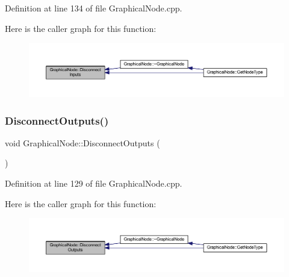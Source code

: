 Definition at line 134 of file Graphical\+Node.\+cpp.

Here is the caller graph for this function\+:
\nopagebreak
\begin{figure}[H]
\begin{center}
\leavevmode
\includegraphics[width=350pt]{class_graphical_node_adf7b68c28c70426681cef018d34f8988_icgraph}
\end{center}
\end{figure}
\mbox{\label{class_graphical_node_a80e76a5ae9dd27b0445a1e6943074852}} 
\subsubsection{\texorpdfstring{Disconnect\+Outputs()}{DisconnectOutputs()}}
{\footnotesize\ttfamily void Graphical\+Node\+::\+Disconnect\+Outputs (\begin{DoxyParamCaption}{ }\end{DoxyParamCaption})}



Definition at line 129 of file Graphical\+Node.\+cpp.

Here is the caller graph for this function\+:
\nopagebreak
\begin{figure}[H]
\begin{center}
\leavevmode
\includegraphics[width=350pt]{class_graphical_node_a80e76a5ae9dd27b0445a1e6943074852_icgraph}
\end{center}
\end{figure}
\mbox{\label{class_graphical_node_a5675edef9951820c61973cd8fb242287}} 
